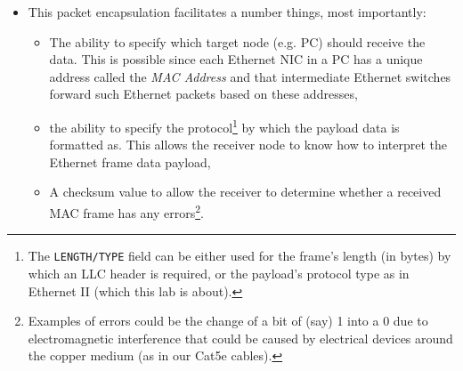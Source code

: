 \documentclass[pdftex,12pt,a4paper]{article}
\begin{document}
\begin{itemize}
                \item This packet encapsulation facilitates a number things,
                most importantly:
                    \begin{itemize}
                        \item The ability to specify which target node (e.g.
                        PC) should receive the data.  This is possible since
                        each Ethernet NIC in a PC has a unique address called
                        the \emph{MAC Address} and that intermediate Ethernet
                        switches forward such Ethernet packets based on these
                        addresses,
                        \item the ability to specify the protocol\footnote{The
                        \texttt{LENGTH/TYPE} field can be either used for the frame's
                        length (in bytes) by which an LLC header is required,
                        or the payload's protocol type as in Ethernet II (which
                        this lab is about).} by
                        which the payload data is formatted as. This allows the
                        receiver node to know how to interpret the Ethernet
                        frame data payload,
                        \item A checksum value to allow the receiver to
                        determine whether a received MAC frame has any
                        errors\footnote{Examples of errors could be the change
                        of a bit of (say) 1 into a 0 due to electromagnetic
                        interference that could be caused by electrical devices
                        around the copper medium (as in our Cat5e cables).}.
                    \end{itemize}
                

\end{itemize}
\end{document}
